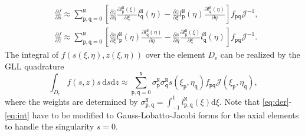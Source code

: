 \documentclass[extra]{gji}
\begin{document}
\begin{align}
 & \frac{\partial f}{\partial s} \approx 
 \sum_{\mathtt{p},\mathtt{q}=0}^{\mathtt{N}}
 \!\left[\frac{\partial z}{\partial \eta} 
 \frac{\partial l_{\mathtt{p}}^{\mathtt{N}}\left(\xi\right)}{\partial \xi}
 l_{\mathtt{q}}^{\mathtt{N}}\left(\eta\right)-  
 \frac{\partial z}{\partial \xi} 
 l_{\mathtt{p}}^{\mathtt{N}}\left(\eta\right)
 \frac{\partial l_{\mathtt{q}}^{\mathtt{N}}\left(\eta\right)}{\partial \eta}
 \right]\!f_{\mathtt{p}\mathtt{q}}\mathcal{J}^{-1},\label{eq:der}\\[.5em]
 & \frac{\partial f}{\partial z} \approx 
 \sum_{\mathtt{p},\mathtt{q}=0}^{\mathtt{N}}
 \!\left[\frac{\partial s}{\partial \xi} 
 l_{\mathtt{p}}^{\mathtt{N}}\left(\eta\right)
 \frac{\partial l_{\mathtt{q}}^{\mathtt{N}}\left(\eta\right)}{\partial \eta}
 -\frac{\partial s}{\partial \eta} 
 \frac{\partial l_{\mathtt{p}}^{\mathtt{N}}\left(\xi\right)}{\partial \xi}
 l_{\mathtt{q}}^{\mathtt{N}}\left(\eta\right)
 \right]\!f_{\mathtt{p}\mathtt{q}}\mathcal{J}^{-1}.\label{eq:der2}
\end{align}
The integral of $f\left(s\left(\xi,\eta\right),z\left(\xi,\eta\right)\right)$ over the element 
$D_\text{e}$ can be realized by the GLL quadrature
\begin{equation}
  \int_{D_\text{e}}f\left(s,z\right)s\,\text{d}s\text{d}z\approx 
  \sum_{\mathtt{p},\mathtt{q}=0}^{\mathtt{N}}
  \sigma_{\mathtt{p}}^{\mathtt{N}} \sigma_{\mathtt{q}}^{\mathtt{N}}
  s\left(\xi_\mathtt{p},\eta_\mathtt{q}\right) f_{\mathtt{p}\mathtt{q}}
  \mathcal{J}\left(\xi_\mathtt{p},\eta_\mathtt{q}\right),
  \label{eq:int}
\end{equation} 
where the weights are determined by 
$\sigma_{\mathtt{p,q}}^{\mathtt{N}}=
\int_{-1}^1 l_{\mathtt{p,q}}^{\mathtt{N}}\left(\xi\right)\text{d}\xi$.  
Note that \eqref{eq:der}-\eqref{eq:int} have to be modified to 
Gauss-Lobatto-Jacobi forms for the axial 
elements \cite[]{nissen2007sem} to handle the singularity $s=0$.
\end{document}
